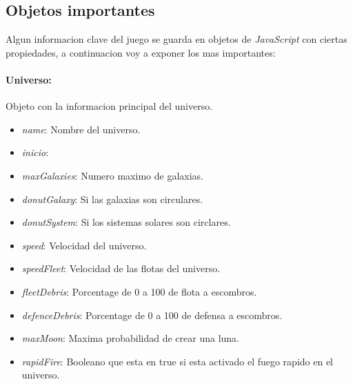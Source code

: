 \documentclass{article}
\begin{document}
\subsection{Objetos importantes}
Algun informacion clave del juego se guarda en objetos de \textit{JavaScript} con ciertas propiedades, a continuacion voy a exponer los mas importantes:

\paragraph{Universo:} Objeto con la informacion principal del universo.
\vspace{-5mm}
\begin{itemize}[noitemsep]
    \item \textit{name}: Nombre del universo.
    \item \textit{inicio}: %
    \item \textit{maxGalaxies}: Numero maximo de galaxias.
    \item \textit{donutGalaxy}: Si las galaxias son circulares.
    \item \textit{donutSystem}: Si los sistemas solares son circlares.
    \item \textit{speed}: Velocidad del universo.
    \item \textit{speedFleet}: Velocidad de las flotas del universo.
    \item \textit{fleetDebris}: Porcentage de 0 a 100 de flota a escombros.
    \item \textit{defenceDebris}: Porcentage de 0 a 100 de defensa a escombros.
    \item \textit{maxMoon}: Maxima probabilidad de crear una luna. 
    \item \textit{rapidFire}: Booleano que esta en true si esta activado el fuego rapido en el universo.
\end{itemize}
\end{document}
